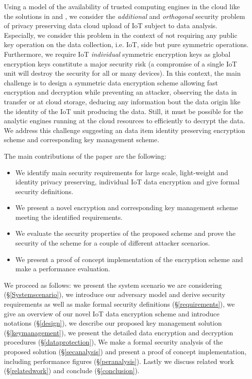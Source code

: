{Using a model of the availability of trusted computing engines in the cloud like the solutions in \cite{Zheng2017} and \cite{Schuster2015}, we consider the \textit {additional} and \textit{orthogonal} security problem of privacy preserving data cloud upload of IoT subject to data analysis. Especially, we consider this problem in the context of {\textit not} requiring any public key operation on the data collection, i.e. IoT, side but pure symmetric operations. Furthermore, we require IoT  \textit{individual} symmetric encryption keys as global encryption keys constitute a major security risk (a compromise of a single IoT unit will destroy the security for all or many devices).  In this context, the main challenge is to design a symmetric data encryption scheme allowing fast encryption and decryption while preventing an attacker, observing the data in transfer or at cloud storage, deducing any information bout the data origin like the identity of the IoT unit producing the data. Still, it must be possible for the analytic engines running at the cloud resources to efficiently to decrypt the data. We address this challenge suggesting an data item identity preserving encryption scheme and corresponding key management scheme.

The main contributions of the paper are the following:
\begin{itemize}
    \item We identify main security requirements for large scale, light-weight and identity privacy preserving, individual IoT data encryption and give formal security definitions.
    \item We present a novel encryption and corresponding key management scheme meeting the identified requirements.
    \item We evaluate the security properties of the proposed scheme and prove the security of the scheme for a couple of different attacker scenarios.
    \item We present a proof of concept implementation of the encryption scheme and make a performance evaluation.
\end{itemize}

We proceed as follows: we present the system scenario we are considering (\S \ref{Systemscenario}), we introduce our adversary model and derive security requirements as well as make formal security definitions (\S \ref{requirements}),  we give an overview of our novel IoT data encryption scheme and introduce notations (\S \ref{design}), we describe our proposed key management solution (\S \ref{keymanagement}), we present the detailed data encryption and decryption procedures (\S \ref{dataprotection}),  We make a formal security analysis of the proposed solution (\S \ref{secanalysis}) and present a proof of concept implementation, including performance figures (\S \ref{peranalysis}). Lastly we discuss related work (\S \ref{relatedwork}) and conclude (\S \ref{conclusion}).


}
